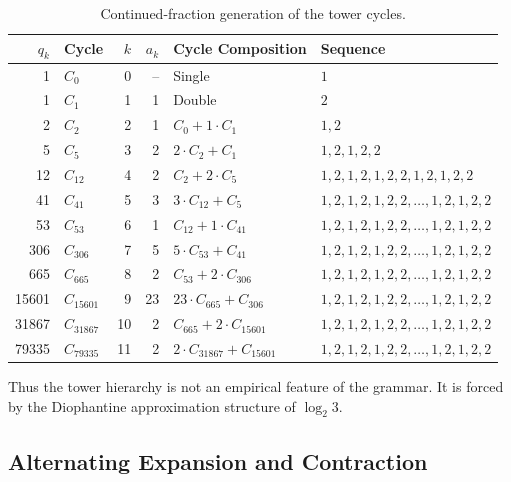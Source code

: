 \documentclass[12pt, oneside]{article}
\numberwithin{equation}{section}
\theoremstyle{definition}
\theoremstyle{plain}
\theoremstyle{remark}
\begin{document}
\begin{table}[ht]
\centering
\caption{Continued-fraction generation of the tower cycles.}
\label{tab:tower-cycles}
\begin{tabular}{r l r r l l}
\hline
$q_k$ & Cycle & $k$ & $a_k$ & Cycle Composition & Sequence \\
\hline
1     & $C_{    0}$ &  0 & -- & Single                          & $1$ \\
1     & $C_{    1}$ &  1 &  1 & Double                          & $2$ \\
2     & $C_{    2}$ &  2 &  1 & $C_{    0} + 1 \cdot C_{    1}$ & $1,2$ \\
5     & $C_{    5}$ &  3 &  2 & $2 \cdot C_{    2} + C_{    1}$ & $1,2,1,2,2$ \\
12    & $C_{   12}$ &  4 &  2 & $C_{    2} + 2 \cdot C_{    5}$ & $1,2,1,2,1,2,2,1,2,1,2,2$ \\
41    & $C_{   41}$ &  5 &  3 & $3 \cdot C_{   12} + C_{    5}$ & $1,2,1,2,1,2,2,\ldots,1,2,1,2,2$  \\
53    & $C_{   53}$ &  6 &  1 & $C_{   12} + 1 \cdot C_{   41}$ & $1,2,1,2,1,2,2,\ldots,1,2,1,2,2$  \\
306   & $C_{  306}$ &  7 &  5 & $5 \cdot C_{   53} + C_{   41}$ & $1,2,1,2,1,2,2,\ldots,1,2,1,2,2$  \\
665   & $C_{  665}$ &  8 &  2 & $C_{   53} + 2 \cdot C_{  306}$ & $1,2,1,2,1,2,2,\ldots,1,2,1,2,2$  \\
15601 & $C_{15601}$ &  9 & 23 & $23 \cdot C_{665} + C_{   306}$ & $1,2,1,2,1,2,2,\ldots,1,2,1,2,2$  \\
31867 & $C_{31867}$ & 10 &  2 & $C_{  665} + 2 \cdot C_{15601}$ & $1,2,1,2,1,2,2,\ldots,1,2,1,2,2$  \\
79335 & $C_{79335}$ & 11 &  2 & $2 \cdot C_{31867} + C_{15601}$ & $1,2,1,2,1,2,2,\ldots,1,2,1,2,2$  \\
\hline
\end{tabular}
\end{table}

Thus the tower hierarchy is not an empirical feature of the grammar.
It is forced by the Diophantine approximation structure of $\log_2 3$.

\subsection{Alternating Expansion and Contraction}
\end{document}
